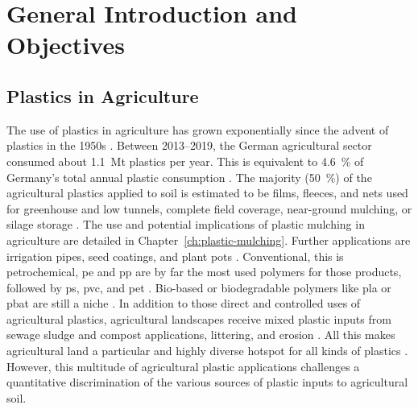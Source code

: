 
\chapter{General Introduction and Objectives}
\label{ch:intro}

\section{Plastics in Agriculture}

The use of plastics in agriculture has grown exponentially since the advent of plastics in the 1950s \citep{MormileWorld2017,GeyerProduction2017}.
Between \numrange[range-phrase={ and }]{2013}{2019}, the German agricultural sector consumed about \SI{1.1}{\mega\tonne} plastics per year. This is equivalent to \SI{4.6}{\percent} of Germany's total annual plastic consumption \citep{BertlingKunststoffe2021}.
The majority (\SI{50}{\percent}) of the agricultural plastics applied to soil is estimated to be films, fleeces, and nets used for greenhouse and low tunnels, complete field coverage, near-ground mulching, or silage storage \citep{MormileWorld2017,BertlingKunststoffe2021}. The use and potential implications of plastic mulching in agriculture are detailed in Chapter~\ref{ch:plastic-mulching}.
Further applications are irrigation pipes, seed coatings, and plant pots \citep{BertlingKunststoffe2021}. Conventional, this is petrochemical, \ac{pe} and \ac{pp} are by far the most used polymers for those products, followed by \ac{ps}, \ac{pvc}, and \ac{pet} \citep{PlasticsEuropePlastics2019,ZhangNonbiodegradable2021}. Bio-based or biodegradable polymers like \ac{pla} or \ac{pbat} are still a niche \citep{PlasticsEuropePlastics2019,BertlingKunststoffe2021}.
In addition to those direct and controlled uses of agricultural plastics, agricultural landscapes receive mixed plastic inputs from sewage sludge and compost applications, littering, and erosion \citep{HurleyFate2018,BlasingPlastics2018,StubbinsPlastics2021}.
All this makes agricultural land a particular and highly diverse hotspot for all kinds of plastics \citep{CorradiniMicroplastics2021,ZhangNonbiodegradable2021}.
However, this multitude of agricultural plastic applications challenges a quantitative discrimination of the various sources of plastic inputs to agricultural soil.


